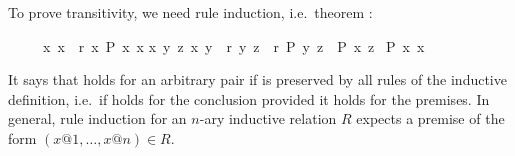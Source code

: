 \begin{isabellebody}
\begin{isamarkuptext}
To prove transitivity, we need rule induction, i.e.\ theorem
:
\begin{isabelle}%
\ \ \ \ \ {}{}{}x{}{}{}{}\ {}x{}{}{}{}\ {}\ {}r{}{}\ {}x{}\ {}P\ x\ x{}\isanewline
{}x\ y\ z{}\ {}{}x{}\ y{}\ {}\ {}r{}\ {}y{}\ z{}\ {}\ {}r{}{}\ {}P\ y\ z{}\ {}\ {}P\ x\ z{}\isanewline
{}\ {}P\ {}x{}{}{}\ {}x{}{}{}%
\end{isabelle}
It says that  holds for an arbitrary pair 
if  is preserved by all rules of the inductive definition,
i.e.\ if  holds for the conclusion provided it holds for the
premises. In general, rule induction for an $n$-ary inductive relation $R$
expects a premise of the form $(x@1,\dots,x@n) \in R$.


\end{isamarkuptext}
\end{isabellebody}
